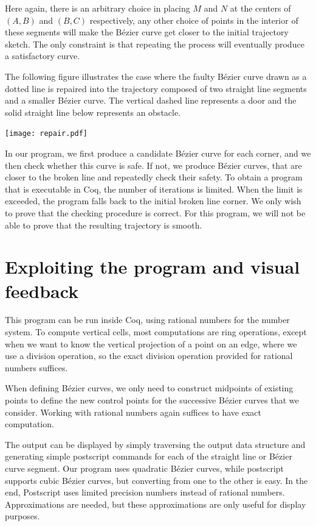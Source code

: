 \documentclass{easychair}
\begin{document}
Here again, there is an arbitrary choice in placing \(M\) and \(N\) at
the centers of \((A,B)\) and \((B,C)\) respectively, any other choice
of points in the interior of these segments will make the Bézier curve
get closer to the initial trajectory sketch.  The only constraint is
that repeating the process will eventually produce a satisfactory curve.

The following figure illustrates the case where the faulty Bézier
curve drawn as a dotted line is repaired into the trajectory composed of two
straight line segments and a smaller Bézier curve.  The vertical
dashed line represents a door and the solid straight line below
represents an obstacle.

\begin{center}
\texttt{[image: repair.pdf]}
\end{center}

In our program, we first produce a candidate Bézier curve for each
corner, and we then check whether this curve is safe.  If not, we
produce Bézier curves, that are closer to the broken line and
repeatedly check their safety.  To obtain a program that is executable
in Coq, the number of iterations is limited.  When the limit is exceeded,
the program falls back to the initial broken line corner.
We only wish to prove that the checking procedure is correct.  For
this program, we will not be able to prove that the resulting trajectory
is smooth.

\section{Exploiting the program and visual feedback}
This program can be run inside Coq, using rational numbers for the
number system.  To compute vertical cells, most computations are ring
operations, except when we want to know the vertical projection of a
point on an edge, where we use a division operation, so the exact
division operation provided for rational numbers suffices.

When defining Bézier curves, we only need to construct midpoints of
existing points to define the new control points for the successive
Bézier curves that we consider.  Working with rational numbers
again suffices to have exact computation.

The output can be displayed by simply traversing the
output data structure and generating simple postscript commands for
each of the straight line or Bézier curve segment.  Our program uses
quadratic Bézier curves, while postscript supports cubic Bézier
curves, but converting from one to the other is easy.  In the end,
Postscript uses limited precision numbers instead of rational numbers.
Approximations are
needed, but these approximations are only useful for display purposes.
\end{document}
